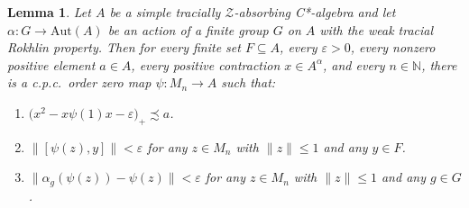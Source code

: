 \documentclass[11pt]{amsart}
\theoremstyle{plain}
\newtheorem{lemma}[theorem]{Lemma}
\theoremstyle{definition}
\theoremstyle{remark}
\numberwithin{equation}{section}
\newcounter{TmpEnumi}
\begin{document}
\begin{lemma}\label{lem_fg}
Let $A$ be a simple tracially $\mathcal{Z}$-absorbing C*-algebra and
let $\alpha \colon G \to \mathrm{Aut} (A)$ be an action of
a finite group $G$ on $A$ with the weak tracial Rokhlin property.
Then for every finite set $F \subseteq A$,
every $\varepsilon > 0$, every  nonzero positive element
$a \in A$, every positive contraction $x \in A^{\alpha}$, and
every $n \in \mathbb{N}$, there is a c.p.c.~order zero
map $\psi \colon M_{n} \to A$ such that:
\begin{enumerate}[label=$\mathrm{(\arabic*)}$]
\item\label{TZS_WTRP_1}
$\big( x^{2} - x \psi (1) x - \varepsilon \big)_{+} \precsim a$.
\item\label{TZS_WTRP_2}
$\| [\psi (z), y] \| < \varepsilon$
for any $z \in M_{n}$ with $\| z \| \leq 1$ and any $y \in F$.
\item\label{TZS_WTRP_3}
$\| \alpha_{g} (\psi (z)) - \psi (z) \| < \varepsilon$
for any $z \in {M}_{n}$
with $\| z \| \leq 1$ and any $g \in G$.
\setcounter{TmpEnumi}{\value{enumi}}
\end{enumerate}
%
\end{lemma}
\end{document}
